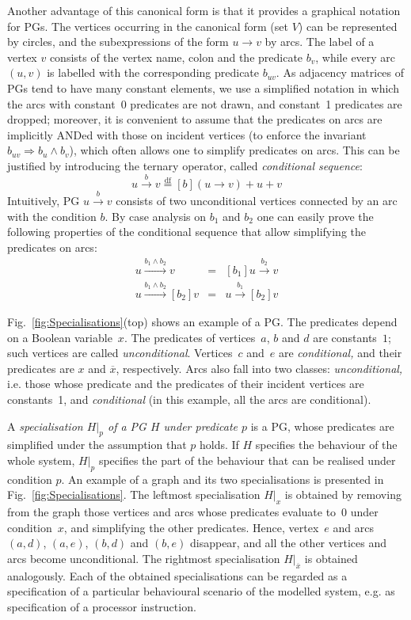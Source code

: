 Another advantage of this canonical form is that it provides a graphical
notation for PGs. The vertices occurring in the canonical form (set
$V$) can be represented by circles, and the subexpressions of the
form $u\rightarrow v$ by arcs. The label of a vertex $v$ consists
of the vertex name, colon and the predicate $b_{v}$, while every
arc~$(u,v)$ is labelled with the corresponding predicate $b_{uv}$.
As adjacency matrices of PGs tend to have many constant elements,
we use a simplified notation in which the arcs with constant~0 predicates
are not drawn, and constant~1 predicates are dropped; moreover, it
is convenient to assume that the predicates on arcs are implicitly
ANDed with those on incident vertices (to enforce the invariant $b_{uv}\Rightarrow b_{u}\wedge b_{v}$),
which often allows one to simplify predicates on arcs. This can be
justified by introducing the ternary operator, called \emph{conditional
sequence}:
\[
u\overset{b}{\longrightarrow}v\overset{\text{df}}{=}[b](u\rightarrow v)+u+v
\]
Intuitively, PG $u\overset{b}{\longrightarrow}v$ consists of two
unconditional vertices connected by an arc with the condition $b$.
By case analysis on $b_{1}$ and $b_{2}$ one can easily prove the
following properties of the conditional sequence that allow simplifying
the predicates on arcs:
\begin{eqnarray*}
[b_{1}]u\xrightarrow{b_{1}\wedge b_{2}}v & = & [b_{1}]u\overset{b_{2}}{\longrightarrow}v\\
u\xrightarrow{b_{1}\wedge b_{2}}[b_{2}]v & = & u\overset{b_{1}}{\longrightarrow}[b_{2}]v
\end{eqnarray*}


Fig.~\ref{fig:Specialisations}(top) shows an example of a PG. The
predicates depend on a Boolean variable~$x$. The predicates of vertices~$a$,
$b$ and $d$ are constants~$1$; such vertices are called \emph{unconditional}.
Vertices~$c$ and~$e$ are \emph{conditional,} and their predicates
are $x$ and $\overline{x}$, respectively. Arcs also fall into two
classes: \emph{unconditional,} i.e. those whose predicate and the
predicates of their incident vertices are constants~1, and \emph{conditional}
(in this example, all the arcs are conditional).

A \emph{specialisation $H\vert_{p}$ of a PG $H$ under predicate
$p$} is a PG, whose predicates are simplified under the assumption
that $p$ holds. If $H$ specifies the behaviour of the whole system,
$H\vert_{p}$ specifies the part of the behaviour that can be realised
under condition $p$. An example of a graph and its two specialisations
is presented in Fig.~\ref{fig:Specialisations}. The leftmost specialisation
$H\vert_{x}$ is obtained by removing from the graph those vertices
and arcs whose predicates evaluate to~0 under condition~$x$, and
simplifying the other predicates. Hence, vertex~$e$ and arcs $(a,d)$,
$(a,e)$, $(b,d)$ and $(b,e)$ disappear, and all the other vertices
and arcs become unconditional. The rightmost specialisation $H\vert_{\overline{x}}$
is obtained analogously. Each of the obtained specialisations can
be regarded as a specification of a particular behavioural scenario
of the modelled system, e.g. as specification of a processor instruction.

